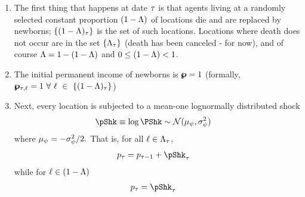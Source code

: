 \documentclass[\econtexRoot/BufferStockTheory.tex]{subfiles}
\begin{document}
\begin{enumerate}
\item The first thing that happens at date $\tau$ is that agents living at a randomly selected constant proportion $(1-\Lambda)$ of locations die and are replaced by newborns; $\{(1-\Lambda)_{\tau}\}$ is the set of such locations.  Locations where death does not occur are in the set  $\{\Lambda_{\tau}\}$ (death has been canceled - for now), and of course $\Lambda=1-(1-\Lambda)$ and $0 \leq (1-\Lambda) < 1$.

\item The initial permanent income of newborns is  $\pmb{\wp}=1$ (formally, $\pmb{\wp}_{\tau,\ell} = 1~\forall~\ell~\in~\{(1-\Lambda)_{\tau}\}$)
\item Next, every location is subjected to a mean-one lognormally distributed shock
  \begin{equation}\begin{gathered}\begin{aligned}
    \pShk & \equiv \log \PShk \sim \mathcal{N}(\pShkMean,\sigma^{2}_{\DnsShk}) \label{eq:pShkDef}
  \end{aligned}\end{gathered}\end{equation}
  where $\mu_{\psi} = -\sigma^{2}_{\psi}/2.$  That is, for all $\ell \in \Lambda_{\tau}$, 
  \begin{equation}\begin{gathered}\begin{aligned}
    \pLog_{\tAbs} & = \pLog_{\tAbs-1}+\pShk_{\tAbs} \label{eq:pRandomwalk}
  \end{aligned}\end{gathered}\end{equation}
  while for $\ell \in (1-\Lambda)$
  \begin{equation}\begin{gathered}\begin{aligned}
    \pLog_{\tAbs} & = \pShk_{\tAbs} \label{eq:pStartsAtZero}
  \end{aligned}\end{gathered}\end{equation}


\end{enumerate}
\end{document}
